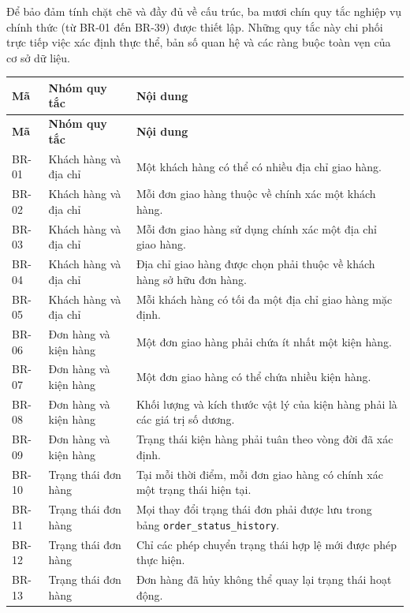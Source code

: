 Để bảo đảm tính chặt chẽ và đầy đủ về cấu trúc, ba mươi chín quy tắc nghiệp vụ chính thức (từ BR-01 đến BR-39) được thiết lập. Những quy tắc này chi phối trực tiếp việc xác định thực thể, bản số quan hệ và các ràng buộc toàn vẹn của cơ sở dữ liệu.

\renewcommand{\arraystretch}{1.15} 
\small 
\begin{longtable}{|p{1.8cm}|p{3.8cm}|p{9cm}|} 
\hline 
\textbf{Mã} & \textbf{Nhóm quy tắc} & \textbf{Nội dung} \\ \hline 
\endfirsthead 

\hline 
\textbf{Mã} & \textbf{Nhóm quy tắc} & \textbf{Nội dung} \\ \hline 
\endhead 

BR-01 & Khách hàng và địa chỉ & Một khách hàng có thể có nhiều địa chỉ giao hàng. \\ \hline 
BR-02 & Khách hàng và địa chỉ & Mỗi đơn giao hàng thuộc về chính xác một khách hàng. \\ \hline 
BR-03 & Khách hàng và địa chỉ & Mỗi đơn giao hàng sử dụng chính xác một địa chỉ giao hàng. \\ \hline 
BR-04 & Khách hàng và địa chỉ & Địa chỉ giao hàng được chọn phải thuộc về khách hàng sở hữu đơn hàng. \\ \hline 
BR-05 & Khách hàng và địa chỉ & Mỗi khách hàng có tối đa một địa chỉ giao hàng mặc định. \\ \hline 
BR-06 & Đơn hàng và kiện hàng & Một đơn giao hàng phải chứa ít nhất một kiện hàng. \\ \hline 
BR-07 & Đơn hàng và kiện hàng & Một đơn giao hàng có thể chứa nhiều kiện hàng. \\ \hline 
BR-08 & Đơn hàng và kiện hàng & Khối lượng và kích thước vật lý của kiện hàng phải là các giá trị số dương. \\ \hline 
BR-09 & Đơn hàng và kiện hàng & Trạng thái kiện hàng phải tuân theo vòng đời đã xác định. \\ \hline 
BR-10 & Trạng thái đơn hàng & Tại mỗi thời điểm, mỗi đơn giao hàng có chính xác một trạng thái hiện tại. \\ \hline 
BR-11 & Trạng thái đơn hàng & Mọi thay đổi trạng thái đơn phải được lưu trong bảng \texttt{order\_status\_history}. \\ \hline 
BR-12 & Trạng thái đơn hàng & Chỉ các phép chuyển trạng thái hợp lệ mới được phép thực hiện. \\ \hline 
BR-13 & Trạng thái đơn hàng & Đơn hàng đã hủy không thể quay lại trạng thái hoạt động. \\ \hline 

\end{longtable}
